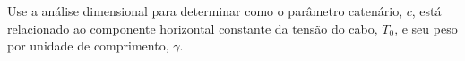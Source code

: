 Use a análise dimensional para determinar como o parâmetro catenário, $c$, está relacionado ao componente horizontal constante da tensão do cabo, $T_0$, e seu peso por unidade de comprimento, $\gamma$.

